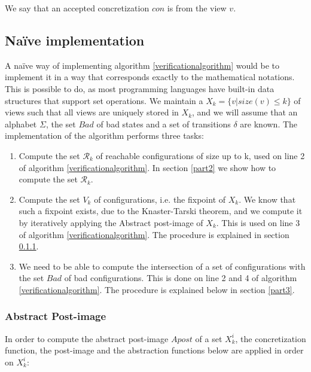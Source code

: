 We say that an accepted concretization $con$ is  from the view $v$.

\subsection{Naïve implementation}
\label{Apost}
A naïve way of implementing algorithm \ref{verificationalgorithm} would be to implement it in a way that corresponds exactly to the mathematical notations. This is possible to do, as most programming languages have built-in data structures that support set operations. We maintain a  $X_k = \{v | size(v) \leq k\}$ of views such that all views are uniquely stored in $X_k$, and we will assume that an alphabet $\Sigma$, the set $Bad$ of bad states and a set of transitions $\delta$ are known. The implementation of the algorithm performs three tasks:

\begin{enumerate}
\item
Compute the set $\mathcal{R}_k$ of reachable configurations of size up to k, used on line 2 of algorithm \ref{verificationalgorithm}. In section \ref{part2} we show how to compute the set $\mathcal{R}_k$.

\item
Compute the set $V_k$ of configurations, i.e. the fixpoint of $X_k$. We know that such a fixpoint exists, due to the Knaster-Tarski theorem\cite{tarski}, and we compute it by iteratively applying the Abstract post-image of $X_k$. This is used on line 3 of algorithm \ref{verificationalgorithm}. The procedure is explained in section \ref{part1}.
\item
We need to be able to compute the intersection of a set of configurations with the set $Bad$ of bad configurations. This is done on line 2 and 4 of algorithm \ref{verificationalgorithm}. The procedure is explained below in section \ref{part3}.
\end{enumerate}

\subsubsection{Abstract Post-image}
\label{part1}
In order to compute the abstract post-image $Apost$ of a set $X_k^i$, the concretization function, the post-image and the abstraction functions below are applied in order on $X_k^i$:


